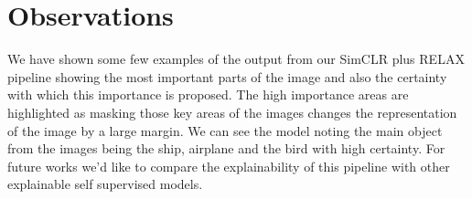 \section{Observations}
\label{sec:observations}

We have shown some few examples of the output from our SimCLR plus RELAX pipeline showing the most important parts of the image and also the certainty with which this importance is proposed. The high importance areas are highlighted as masking those key areas of the images changes the representation of the image by a large margin. We can see the model noting the main object from the images being the ship, airplane and the bird with high certainty. For future works we'd like to compare the explainability of this pipeline with other explainable self supervised models.